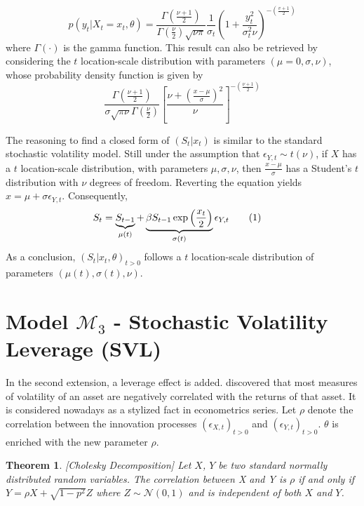 \documentclass[11pt,a4,twosided,singlespacing,titlepagenumber=on]{scrreprt}
\numberwithin{equation}{chapter} %
\newtheorem{theorem}{Theorem}%
\theoremstyle{remark}
\newcommand\numberthis{\addtocounter{equation}{1}\tag{\theequation}}
\begin{document}
\begin{equation}
p(y_t | X_t = x_t, \theta) = \frac{\Gamma(\frac{\nu+1}{2})}{\Gamma(\frac{\nu}{2}) \sqrt{\nu\pi}} \frac{1}{\sigma_t}\left( 1 + \frac{y_t^2}{\sigma_t^2 \nu}\right)^{-\left(\frac{v+1}{2} \right)}
\end{equation}
where $\Gamma(\cdot)$ is the gamma function. This result can also be retrieved by considering the $t$ location-scale distribution with parameters $(\mu = 0, \sigma, \nu)$, whose probability density function is given by
\begin{equation}
\frac{\Gamma \left(\frac{\nu+1}{2} \right)}{\sigma \sqrt{\pi \nu} \Gamma \left(\frac{\nu}{2} \right)} \left[ \frac{\nu + \left( \frac{x-\mu}{\sigma}\right)^2}{\nu}\right]^{-\left(\frac{\nu+1}{2} \right)}
\end{equation}


The reasoning to find a closed form of $(S_t | x_t)$ is similar to the standard stochastic volatility model. Still under the assumption that $\epsilon_{Y,t} \sim t(\nu)$, if $X$ has a $t$ location-scale distribution, with parameters $\mu, \sigma, \nu$, then $\frac{x-\mu}{\sigma}$ has a Student's $t$ distribution with $\nu$ degrees of freedom. Reverting the equation yields $x = \mu + \sigma \epsilon_{Y,t}$. Consequently,
\begin{align*}
S_t  &= \underbrace{S_{t-1}}_{\mu(t)} + \underbrace{\beta S_{t-1} \exp \left( \frac{x_t}{2} \right)}_{\sigma(t)} \epsilon_{Y,t} \numberthis
\end{align*}
As a conclusion, $(S_t | x_t, \theta)_{t>0}$ follows a $t$ location-scale distribution of parameters $(\mu(t), \sigma(t), \nu)$.

\section{Model $\mathcal{M}_3$ - Stochastic Volatility Leverage (SVL)}
In the second extension, a leverage effect is added. \cite{black1976} discovered that most measures of volatility of an asset are negatively correlated with the returns of that asset. It is considered nowadays as a stylized fact in econometrics series. Let $\rho$ denote the correlation between the innovation processes $(\epsilon_{X,t})_{t>0}$ and $(\epsilon_{Y,t})_{t>0}$. $\theta$ is enriched with the new parameter $\rho$.

\begin{theorem}
\textit{
[Cholesky Decomposition] Let $X$, $Y$ be two standard normally distributed random variables. The correlation between X and Y is $\rho$ if and only if $Y = \rho X + \sqrt{1-p^2} Z$ where $Z \sim \mathcal{N}(0,1)$ and is independent of both $X$ and $Y$.
}
\end{theorem}
\end{document}
